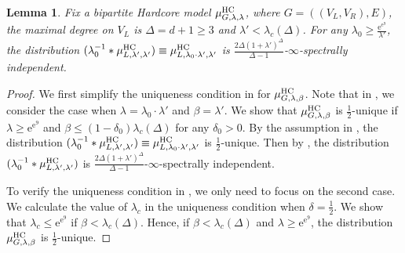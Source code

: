 \documentclass[11pt,a4paper]{article}
\newcommand{\e}{\mathrm{e}}
\newtheorem{lemma}[theorem]{Lemma}
\theoremstyle{definition}
\begin{document}
\begin{lemma}\label{lem:bhc-large-lambda-unique}
Fix a bipartite Hardcore model $\mu_{G,\lambda,\lambda}^{\textnormal{HC}}$, where $G=((V_L,V_R),E)$, the maximal degree on $V_L$ is $\Delta=d+1\geq 3$  and $\lambda'< \lambda_c(\Delta)$. For any $\lambda_0\geq \frac{\e^{\e^9}}{\lambda'}$, the distribution $(\lambda_0^{-1} * \mu_{L,\lambda',\lambda'}^{\textnormal{HC}})\equiv \mu_{L,\lambda_0\cdot\lambda',\lambda'}^{\textnormal{HC}}$ is $\frac{2\Delta(1+\lambda')^\Delta}{\Delta-1   }$-$\infty$-spectrally independent. 
\end{lemma}
\begin{proof}
We first simplify the uniqueness condition in  for $\mu_{G,\lambda,\beta}^{\textnormal{HC}}$. 
Note that in , we consider the case when $\lambda = \lambda_0 \cdot \lambda'$ and $\beta = \lambda'$. 
We show that $\mu_{G,\lambda,\beta}^{\textnormal{HC}}$ is $\frac{1}{2}$-unique if $\lambda \geq \e^{\e^9}$ and $\beta \leq (1-\delta_0)\lambda_c(\Delta)$ for any $\delta_0 > 0$. By the assumption in , the distribution $(\lambda_0^{-1} * \mu_{L,\lambda',\lambda'}^{\textnormal{HC}})\equiv \mu_{L,\lambda_0\cdot\lambda',\lambda'}^{\textnormal{HC}}$ is $\frac{1}{2}$-unique. Then by , the distribution $(\lambda_0^{-1} * \mu_{L,\lambda',\lambda'}^{\textnormal{HC}})$ is $\frac{2\Delta(1+\lambda')^\Delta}{\Delta-1   }$-$\infty$-spectrally independent.


To verify the uniqueness condition in , we only need to focus on the second case.
We calculate the value of $\lambda_c$ in the uniqueness condition when $\delta=\frac{1}{2}$.
We show that $\lambda_c \leq \e^{\e^9}$ if $\beta < \lambda_c(\Delta)$.
Hence, if $\beta < \lambda_c(\Delta)$ and $\lambda \geq \e^{\e^9}$, the distribution $\mu_{G,\lambda,\beta}^{\textnormal{HC}}$ is $\frac{1}{2}$-unique.


\end{proof}
\end{document}
